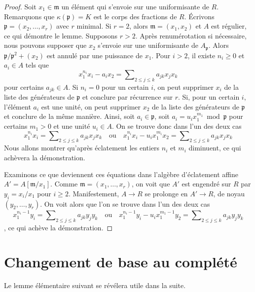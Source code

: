 \begin{proof} Soit $x_1 \in \mathfrak m$ un élément qui s'envoie sur une uniformisante de $R$. Remarquons que $\kappa(\mathfrak p) = K$ est le corps des fractions de $R$. Écrivons $\mathfrak p = (x_2, \ldots, x_r)$ avec $r$ minimal. Si $r = 2$, alors $\mathfrak m = (x_1, x_2)$ et $A$ est régulier, ce qui démontre le lemme. Supposons $r > 2$. Après renumérotation si nécessaire, nous pouvons supposer que $x_2$ s'envoie sur une uniformisante de $A_\mathfrak p$. Alors $\mathfrak p/\mathfrak p^2 + (x_2)$ est annulé par une puissance de $x_1$. Pour $i > 2$, il existe $n_i \geq 0$ et $a_i \in A$ tels que $$
x_1^{n_i} x_i - a_i x_2 = \sum\nolimits_{2 \leq j \leq k} a_{jk} x_jx_k
$$ pour certains $a_{jk} \in A$. Si $n_i = 0$ pour un certain $i$, on peut supprimer $x_i$ de la liste des générateurs de $\mathfrak p$ et conclure par récurrence sur $r$. Si, pour un certain $i$, l'élément $a_i$ est une unité, on peut supprimer $x_2$ de la liste des générateurs de $\mathfrak p$ et conclure de la même manière. Ainsi, soit $a_i \in \mathfrak p$, soit $a_i = u_i x_1^{m_1} \bmod \mathfrak p$ pour certains $m_1 > 0$ et une unité $u_i \in A$. On se trouve donc dans l'un des deux cas $$
x_1^{n_i} x_i = \sum\nolimits_{2 \leq j \leq k} a_{jk} x_jx_k
\quad\text{ou}\quad
x_1^{n_i} x_i - u_i x_1^{m_i} x_2 =
\sum\nolimits_{2 \leq j \leq k} a_{jk} x_jx_k
$$ Nous allons montrer qu'après éclatement les entiers $n_i$ et $m_i$ diminuent, ce qui achèvera la démonstration.

\medskip\noindent Examinons ce que deviennent ces équations dans l'algèbre d'éclatement affine $A' = A[\mathfrak m/x_1]$. Comme $\mathfrak m = (x_1, \ldots, x_r)$, on voit que $A'$ est engendré sur $R$ par $y_i = x_i/x_1$ pour $i \geq 2$. Manifestement, $A \to R$ se prolonge en $A' \to R$, de noyau $(y_2, \ldots, y_r)$. On voit alors que l'on se trouve dans l'un des deux cas $$
x_1^{n_i - 1} y_i = \sum\nolimits_{2 \leq j \leq k} a_{jk} y_jy_k
\quad\text{ou}\quad
x_1^{n_i - 1} y_i - u_i x_1^{m_1 - 1} y_2 =
\sum\nolimits_{2 \leq j \leq k} a_{jk} y_jy_k
$$, ce qui achève la démonstration. \end{proof}




\section{Changement de base au complété} \label{section-aux}

\noindent Le lemme élémentaire suivant se révélera utile dans la suite.

